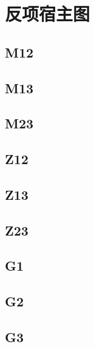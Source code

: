 \documentclass[UTF8]{ctexart}
\begin{document}
\section*{反项宿主图}
\subsection*{M12}

\subsection*{M13}

\subsection*{M23}

\subsection*{Z12}

\subsection*{Z13}

\subsection*{Z23}

\subsection*{G1}

\subsection*{G2}

\subsection*{G3}

\end{document}
